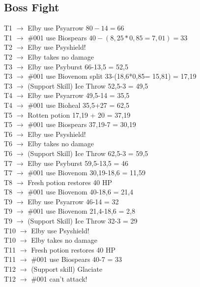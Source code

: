 \subsection{Boss Fight}

T1 $\rightarrow$ Elby use Psyarrow $80-14 = 66$\\
T1 $\rightarrow$ \#001 use Biospears $40-(8,25*0,85= 7,01) = 33$\\
T2 $\rightarrow$ Elby use Psyshield!\\
T2 $\rightarrow$ Elby takes no damage\\
T3 $\rightarrow$ Elby use Psyburst 66-13,5 = 52,5 \\
T3 $\rightarrow$ \#001 use Biovenom split 33-(18,6*0,85= 15,81) = 17,19\\
T3 $\rightarrow$ (Support Skill) Ice Throw 52,5-3 = 49,5\\
T4 $\rightarrow$ Elby use Psyarrow 49,5-14 = 35,5\\
T4 $\rightarrow$ \#001 use Bioheal 35,5+27 = 62,5\\
T5 $\rightarrow$ Rotten potion 17,19 + 20 = 37,19\\
T5 $\rightarrow$ \#001 use Biospears 37,19-7 = 30,19\\
T6 $\rightarrow$ Elby use Psyshield!\\
T6 $\rightarrow$ Elby takes no damage\\
T6 $\rightarrow$ (Support Skill) Ice Throw 62,5-3 = 59,5\\
T7 $\rightarrow$ Elby use Psyburst 59,5-13,5 = 46\\
T7 $\rightarrow$ \#001 use Biovenom 30,19-18,6 = 11,59\\
T8 $\rightarrow$ Fresh potion restores 40 HP\\
T8 $\rightarrow$ \#001 use Biovenom 40-18,6 = 21,4\\
T9 $\rightarrow$ Elby use Psyarrow 46-14 = 32\\
T9 $\rightarrow$ \#001 use Biovenom 21,4-18,6 = 2,8\\
T9 $\rightarrow$ (Support Skill) Ice Throw 32-3 = 29\\
T10 $\rightarrow$ Elby use Psyshield!\\
T10 $\rightarrow$ Elby takes no damage\\
T11 $\rightarrow$ Fresh potion restores 40 HP\\
T11 $\rightarrow$ \#001 use Biospears 40-7 = 33\\
T12 $\rightarrow$ (Support skill) Glaciate\\
T12 $\rightarrow$ \#001 can't attack!\\
